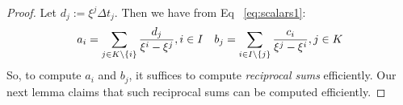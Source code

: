\begin{proof}
    Let $d_j:=\xi^j \Delta t_j$. Then we have from Eq ~\eqref{eq:scalars1}:\\
    \begin{gather}\label{eq:scalars}
    a_i = \sum_{j\in K\setminus \{i\}}\frac{d_j}{\xi^i-\xi^j}, i\in I\quad
    b_j=  \sum_{i\in I\setminus \{j\}}\frac{c_i}{\xi^j - \xi^i}, j\in K
    \end{gather}
    So, to compute $a_i$ and $b_j$, it suffices to compute {\em reciprocal sums} efficiently. Our next lemma claims that
    such reciprocal sums can be computed efficiently.
    

\end{proof}
